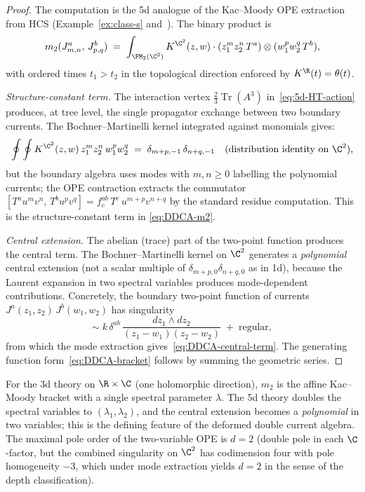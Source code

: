 \begin{proof}
The computation is the 5d analogue of the Kac--Moody
OPE extraction from HCS (Example~\ref{ex:class-s}
and~\cite{costello-gaiotto}). The binary product is
\[
 m_2(J^a_{m,n},\, J^b_{p,q})
 \;=\;
 \int_{\FM_2(\C^2)}
 K^{\C^2}(z,w)
 \cdot
 (z_1^m z_2^n\, T^a)
 \otimes
 (w_1^p w_2^q\, T^b),
\]
with ordered times $t_1 > t_2$ in the topological
direction enforced by $K^{\R}(t) = \theta(t)$.

\emph{Structure-constant term.} The interaction vertex
$\frac{2}{3}\operatorname{Tr}(A^3)$ in~\eqref{eq:5d-HT-action}
produces, at tree level, the single propagator exchange
between two boundary currents. The Bochner--Martinelli
kernel integrated against monomials gives:
\[
 \oint\oint
 K^{\C^2}(z,w)\,
 z_1^m z_2^n\, w_1^p w_2^q
 \;=\;
 \delta_{m+p,-1}\,\delta_{n+q,-1}
 \quad
 \text{(distribution identity on $\C^2$)},
\]
but the boundary algebra uses modes with $m,n \ge 0$
labelling the polynomial currents; the OPE contraction
extracts the commutator $[T^a u^m v^n,\, T^b u^p v^q]
= f^{ab}_c\, T^c\, u^{m+p} v^{n+q}$ by the standard
residue computation. This is the structure-constant
term in \eqref{eq:DDCA-m2}.

\emph{Central extension.} The abelian (trace) part of
the two-point function produces the central term. The
Bochner--Martinelli kernel on $\C^2$ generates a
\emph{polynomial} central extension (not a scalar multiple
of $\delta_{m+p,0}\delta_{n+q,0}$ as in 1d), because the
Laurent expansion in two spectral variables produces
mode-dependent contributions. Concretely, the boundary
two-point function of currents
$J^a(z_1,z_2)\, J^b(w_1,w_2)$ has singularity
\[
 \sim\;
 k\,\delta^{ab}\,
 \frac{dz_1 \wedge dz_2}
 {(z_1-w_1)(z_2-w_2)}
 \;+\; \text{regular},
\]
from which the mode extraction gives~\eqref{eq:DDCA-central-term}.
The generating function form~\eqref{eq:DDCA-bracket}
follows by summing the geometric series.
\end{proof}

\begin{remark}
\label{rem:DDCA-vs-KM}
For the 3d theory on $\R \times \C$ (one holomorphic
direction), $m_2$ is the affine Kac--Moody bracket with
a single spectral parameter $\lambda$. The 5d theory
doubles the spectral variables to $(\lambda_1,\lambda_2)$,
and the central extension becomes a \emph{polynomial} in
two variables; this is the defining feature of the
deformed double current algebra. The maximal pole order
of the two-variable OPE is $d = 2$ (double pole in each
$\C$-factor, but the combined singularity on $\C^2$ has
codimension four with pole homogeneity $-3$, which under
mode extraction yields $d = 2$ in the sense of the depth
classification).
\end{remark}

